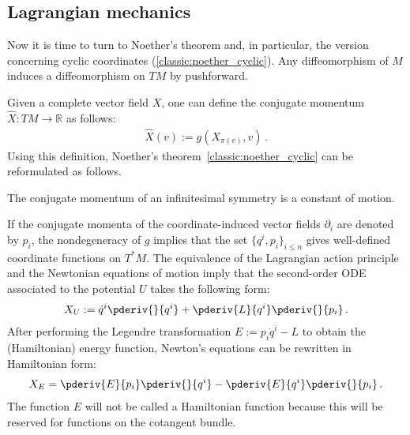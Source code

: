 \subsection{Lagrangian mechanics}

    Now it is time to turn to Noether's theorem and, in particular, the version concerning cyclic coordinates (\cref{classic:noether_cyclic}). Any diffeomorphism of $M$ induces a diffeomorphism on $TM$ by pushforward.

    Given a complete vector field $X$, one can define the conjugate momentum $\widehat{X}:TM\rightarrow\mathbb{R}$ as follows:
    \begin{gather}
        \label{classic:metric_conjugate_momentum}
        \widehat{X}(v) := g(X_{\pi(v)},v)\,.
    \end{gather}
    Using this definition, Noether's theorem~\ref{classic:noether_cyclic} can be reformulated as follows.
    \begin{theorem}
        The conjugate momentum of an infinitesimal symmetry is a constant of motion.
    \end{theorem}

    If the conjugate momenta of the coordinate-induced vector fields $\partial_i$ are denoted by $p_i$, the nondegeneracy of $g$ implies that the set $\{q^i,p_i\}_{i\leq n}$ gives well-defined coordinate functions on $T^*M$. The equivalence of the Lagrangian action principle and the Newtonian equations of motion imply that the second-order ODE associated to the potential $U$ takes the following form:
    \begin{gather}
        X_U := \dot{q}^i\pderiv{}{q^i} + \pderiv{L}{q^i}\pderiv{}{p_i}\,.
    \end{gather}
    After performing the Legendre transformation $E:=p_i\dot{q}^i-L$ to obtain the (Hamiltonian) energy function, Newton's equations can be rewritten in Hamiltonian form:
    \begin{gather}
        X_E = \pderiv{E}{p_i}\pderiv{}{q^i}-\pderiv{E}{q^i}\pderiv{}{p_i}\,.
    \end{gather}
    The function $E$ will not be called a Hamiltonian function because this will be reserved for functions on the cotangent bundle.

